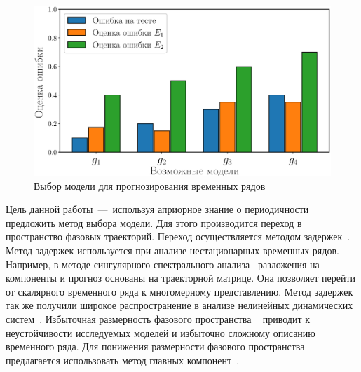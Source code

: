\documentclass[article,14pt,subf,href,colorlinks=true
]{disser}
\begin{document}
\begin{figure}[H]
    \centering
    \captionsetup{justification=centering,margin=2cm}
    \includegraphics[scale = 0.5]{figs/model_selection_example.eps}
    \caption{Выбор модели для прогнозирования временных рядов}
    \label{fg:ms_estimates_comp}
\end{figure}
 
Цель данной работы~---~используя априорное знание о периодичности предложить метод выбора модели.
Для этого производится переход в пространство фазовых траекторий.
Переход осуществляется методом задержек~\cite{LAI19961}.
Метод задержек используется при анализе нестационарных временных рядов.
Например, в методе сингулярного спектрального анализа~\cite{Golyandina2002} разложения на компоненты и прогноз основаны на траекторной матрице.
Она позволяет перейти от скалярного временного ряда к многомерному представлению.
Метод задержек так же получили широкое распространение в анализе нелинейных динамических систем~\cite{Takens1981, LAI19961}.
Избыточная размерность фазового пространства ~\cite{Golyandina2002, Motrenko2015,Usmanova2020} приводит к неустойчивости исследуемых моделей и избыточно сложному описанию временного ряда.
Для понижения размерности фазового пространства предлагается использовать  метод главных компонент~\cite{Ezukwoke2019, Scholkopf1998}.
\end{document}
